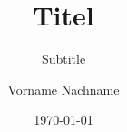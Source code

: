 \documentclass[fontsize=11pt,headsepline, twoside,cleardoublepage=empty,paper=a4,listof=totoc,bibliography=totoc]{scrbook}
\author{Vorname Nachname}
\date{\today}
\title{Titel}
\subtitle{Subtitle}
\begin{document}
\makeatletter

{}




\makeatother



	\tableofcontents
    \cleardoublepage




\begin{appendix}

\end{appendix}

\printbibliography
\clearpage

\end{document}
